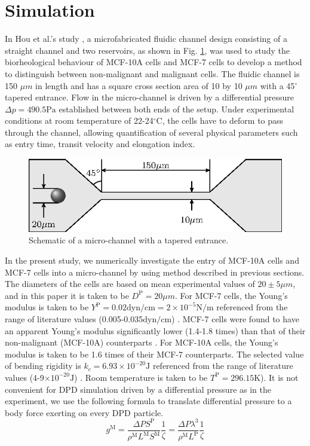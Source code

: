 \documentclass[%
 reprint,
 amsmath,amssymb,
 aps,
]{revtex4-1}
\begin{document}
\section{Simulation}\label{simulation}
In Hou et al.'s study \cite{hou_deformability_2009}, a microfabricated fluidic channel design consisting of a straight channel and two reservoirs, as shown in Fig. \ref{fig:experimental_setup}, was used to study the biorheological behaviour of MCF-10A cells and MCF-7 cells to develop a method to distinguish between non-malignant and malignant cells. 
The fluidic channel is 150 $\mu m$ in length and has a square cross section area of 10 by 10 $\mu m$ with a 45$^\circ$ tapered entrance. Flow in the micro-channel is driven by a differential pressure $\Delta p = 490.5 \mathrm{Pa}$ established between both ends of the setup. Under experimental conditions at room temperature of 22-24$^\circ\mathrm{C}$, the cells have to deform to pass through the channel, allowing quantification of several physical parameters such as entry time, transit velocity and elongation index. 
\begin{figure}[!htb]
\centering
\includegraphics{3Dchannel.eps}
\caption{Schematic of a micro-channel with a tapered entrance.}\label{fig:experimental_setup}
\end{figure}

In the present study, we numerically investigate the entry of MCF-10A cells and MCF-7 cells into a micro-channel by using method described in previous sections. The diameters of the cells are based on mean experimental values of $20 \pm 5 \mu m$, and in this paper it is taken to be $D^\mathrm{P} = 20 \mu m$. For MCF-7 cells, the Young's modulus is taken to be $Y^\mathrm{P} = 0.02\mathrm{dyn/cm}=2\times 10^{-5} \mathrm{N/m}$ referenced from the range of literature values (0.005-0.035$\mathrm{dyn/cm}$) \cite{leong_modeling_2011}. MCF-7 cells were found to have an apparent Young's modulus significantly lower (1.4-1.8 times) than that of their non-malignant (MCF-10A) counterparts \cite{li_afm_2008}. For MCF-10A cells, the Young's modulus is taken to be 1.6 times of their MCF-7 counterparts. The selected value of bending rigidity is $k_c = 6.93\times 10^{-20}\mathrm{J}$ referenced from the range of literature values (4-9$\times 10^{-20}\mathrm{J}$) \cite{evans_entropy-driven_1990}. Room temperature is taken to be $T^\mathrm{P} = 296.15\mathrm{K}$). It is not convenient for DPD simulation driven by a differential pressure as in the experiment, we use the following formula to translate differential pressure to a body force exerting on every DPD particle.
\begin{equation}
g^\mathrm{M} = \frac{\Delta P S^\mathrm{P}}{\rho^\mathrm{M} L^\mathrm{M} S^\mathrm{M}}\frac{1}{\zeta} 
= \frac{\Delta P \lambda^3}{\rho^\mathrm{M} L^\mathrm{P}}\frac{1}{\zeta} 
\end{equation}
\end{document}
